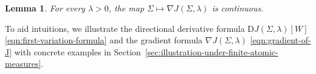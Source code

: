 \documentclass[sn-mathphys-num]{sn-jnl}%
\numberwithin{equation}{section}
\newcommand{\kernel}{K}
\newtheorem{lemma}{Lemma}
\newcommand{\grad}{\nabla}
\newcommand{\Sym}{{\rm \mathrm{Sym}}}
\theoremstyle{thmstyleone}%
\theoremstyle{thmstyletwo}%
\newtheorem{remark}{Remark}%
\theoremstyle{thmstylethree}%
\begin{document}
\vspace{.5em} 
\begin{lemma}
For every $\lambda > 0$, the map $\Sigma \mapsto \nabla J(\Sigma,\lambda)$ is continuous. 
\end{lemma}

%
\vspace{.5em} 

To aid intuitions, we illustrate the directional derivative formula
$\mathrm{D}J(\Sigma,\lambda)[W]$ \eqref{eqn:first-variation-formula} and the gradient 
formula $\grad J(\Sigma, \lambda)$ \eqref{eqn:gradient-of-J} with concrete examples
in Section~\ref{sec:illustration-under-finite-atomic-measures}. %


\end{document}

